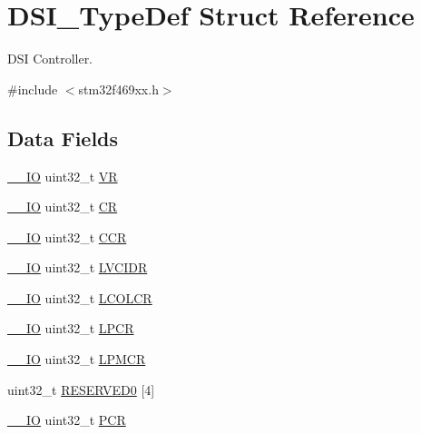 \hypertarget{struct_d_s_i___type_def}{}\section{D\+S\+I\+\_\+\+Type\+Def Struct Reference}
\label{struct_d_s_i___type_def}


D\+SI Controller.  




{\ttfamily \#include $<$stm32f469xx.\+h$>$}

\subsection*{Data Fields}
\begin{DoxyCompactItemize}
\item 
\hyperlink{core__sc300_8h_aec43007d9998a0a0e01faede4133d6be}{\+\_\+\+\_\+\+IO} uint32\+\_\+t \hyperlink{struct_d_s_i___type_def_a6349b3f5bd84a9d19d3de5b8c36ce900}{VR}
\item 
\hyperlink{core__sc300_8h_aec43007d9998a0a0e01faede4133d6be}{\+\_\+\+\_\+\+IO} uint32\+\_\+t \hyperlink{struct_d_s_i___type_def_ab40c89c59391aaa9d9a8ec011dd0907a}{CR}
\item 
\hyperlink{core__sc300_8h_aec43007d9998a0a0e01faede4133d6be}{\+\_\+\+\_\+\+IO} uint32\+\_\+t \hyperlink{struct_d_s_i___type_def_a5e1322e27c40bf91d172f9673f205c97}{C\+CR}
\item 
\hyperlink{core__sc300_8h_aec43007d9998a0a0e01faede4133d6be}{\+\_\+\+\_\+\+IO} uint32\+\_\+t \hyperlink{struct_d_s_i___type_def_a5aa70d8b857aa2b3fb2b1767eb2b82e0}{L\+V\+C\+I\+DR}
\item 
\hyperlink{core__sc300_8h_aec43007d9998a0a0e01faede4133d6be}{\+\_\+\+\_\+\+IO} uint32\+\_\+t \hyperlink{struct_d_s_i___type_def_adec8c4fe22023eb8df6fb9069b9204a5}{L\+C\+O\+L\+CR}
\item 
\hyperlink{core__sc300_8h_aec43007d9998a0a0e01faede4133d6be}{\+\_\+\+\_\+\+IO} uint32\+\_\+t \hyperlink{struct_d_s_i___type_def_aa88f7acf487a73acd763e8478ac58e7c}{L\+P\+CR}
\item 
\hyperlink{core__sc300_8h_aec43007d9998a0a0e01faede4133d6be}{\+\_\+\+\_\+\+IO} uint32\+\_\+t \hyperlink{struct_d_s_i___type_def_ad7eabfe197dd4e367c4817b64fc8a207}{L\+P\+M\+CR}
\item 
uint32\+\_\+t \hyperlink{struct_d_s_i___type_def_a5a51afd3eec34b9f5806b754eb0101a1}{R\+E\+S\+E\+R\+V\+E\+D0} \mbox{[}4\mbox{]}
\item 
\hyperlink{core__sc300_8h_aec43007d9998a0a0e01faede4133d6be}{\+\_\+\+\_\+\+IO} uint32\+\_\+t \hyperlink{struct_d_s_i___type_def_a6091bd215b74df162dd3bc51621c63ca}{P\+CR}

\end{DoxyCompactItemize}
